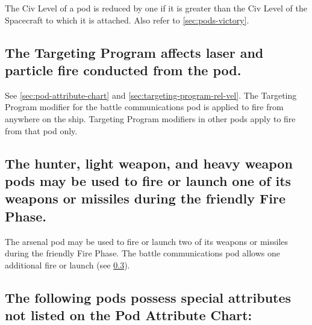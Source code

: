 The Civ Level of a pod is reduced by one if it is greater than the Civ
Level of the Spacecraft to which it is attached. Also refer to
\ref{sec:pods-victory}.


\subsection[Targeting Program]{The Targeting Program affects laser and
  particle fire 
  conducted from the pod.}
\label{sec:targeting-program-pod}



See \ref{sec:pod-attribute-chart} and
\ref{sec:targeting-program-rel-vel}. The Targeting Program modifier
for the battle communications pod is applied to fire from anywhere on
the ship.  Targeting Program modifiers in other pods apply to fire
from that pod only.



\subsection[Missile Launch]{The hunter, light weapon, and heavy weapon
  pods may be used to fire or launch one of its weapons or  
  missiles during the friendly Fire Phase.}
\label{sec:missile-launch-pod}



The arsenal pod may be used to fire or launch two of its weapons or
missiles during the friendly Fire Phase. The battle communications pod
allows one additional fire or launch (see \ref{sec:special-attributes}).


\subsection[Special Attributes]{The following pods possess special
  attributes not listed 
  on the Pod Attribute Chart:}
\label{sec:special-attributes}

